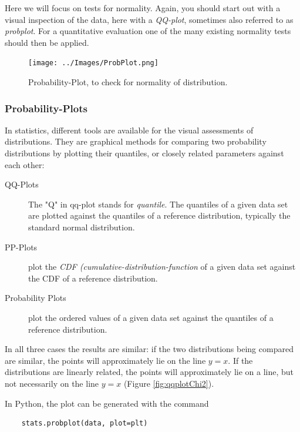 Here we will focus on tests for normality. Again, you should start out with a visual inspection of the data, here with a \emph{QQ-plot}, sometimes also referred to as \emph{probplot}. For a quantitative evaluation one of the many existing normality tests should then be applied.

\begin{figure}
  \centering
  \texttt{[image: ../Images/ProbPlot.png]}\\
  \caption{Probability-Plot, to check for normality of distribution.}\label{fig:qqplot}
\end{figure}


\subsubsection{Probability-Plots} 

In statistics, different tools are available for the visual assessments of distributions. They are graphical methods for comparing two probability distributions by plotting their \glspl{quantile}, or closely related parameters against each other:

\begin{description}
  \item[QQ-Plots] The "Q" in \acrfull{qq-plot} stands for \emph{quantile}. The quantiles of a given data set are plotted against the quantiles of a reference distribution, typically the standard normal distribution.
  \item[PP-Plots]  plot the \emph{CDF (cumulative-distribution-function} of a given data set against the CDF of a reference distribution.
  \item[Probability Plots]  plot the ordered values of a given data set against the quantiles of a reference distribution.
\end{description}

In all three cases the results are similar: if the two distributions being compared are similar, the points will approximately lie on the line $y = x$. If the distributions are linearly related, the points will approximately lie on a line, but not necessarily on the line $y = x$ (Figure \ref{fig:qqplotChi2}).

In Python, the plot can be generated with the command

\begin{lstlisting}
    stats.probplot(data, plot=plt)
\end{lstlisting}

